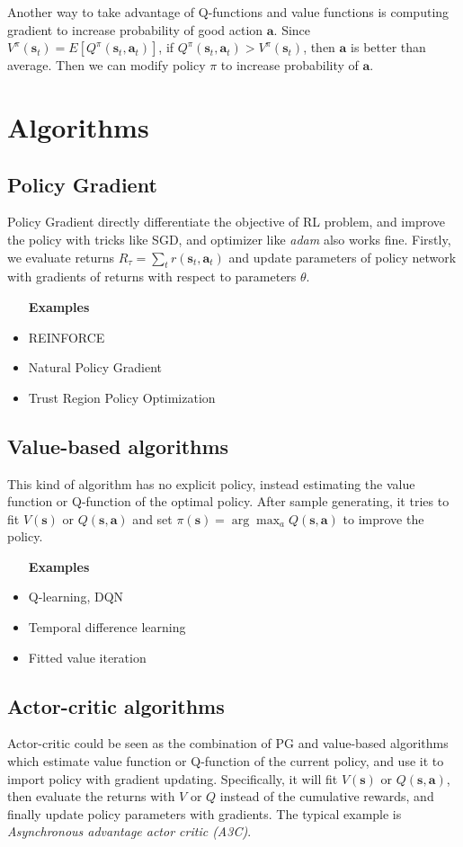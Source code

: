 \documentclass{tufte-handout}
\newcommand{\s}{\mathbf{s}}
\newcommand{\act}{\mathbf{a}}
\begin{document}
Another way to take advantage of Q-functions and value functions is computing gradient to increase probability of good action $\act$. Since
$V^\pi (\s_t) = E[Q^\pi(\s_t, \act_t)]  $, if $Q^\pi(\s_t, \act_t) > V^\pi (\s_t)$, then $\act$ is better than average. Then we can modify policy $\pi$
to increase probability of $\act$.

\section{Algorithms}

\subsection{Policy Gradient}

Policy Gradient directly differentiate the objective of RL problem, and improve the policy with tricks like SGD, and optimizer like \emph{adam}
also works fine. Firstly, we evaluate returns $R_\tau = \sum_t r(\s_t, \act_t) $ and update parameters of policy network with gradients of returns with respect to parameters $\theta$.
\begin{itemize}
  \item[\textbf{Examples}]
  \item REINFORCE
  \item Natural Policy Gradient
  \item Trust Region Policy Optimization
\end{itemize}

\subsection{Value-based algorithms}
This kind of algorithm has no explicit policy, instead estimating the value function or Q-function of the optimal policy. After sample generating, it tries to fit $V(\s)$ or $Q(\s, \act) $ and set $\pi(\s) =\arg \max_a Q(\s, \act) $ to improve the policy.
\begin{itemize}
  \item[\textbf{Examples}]
  \item Q-learning, DQN
  \item Temporal difference learning
  \item Fitted value iteration
\end{itemize}

\subsection{Actor-critic algorithms}
Actor-critic could be seen as the combination of PG and value-based algorithms which estimate value function or Q-function of the current policy, and use it to import policy with gradient updating. Specifically, it will fit $V(\s) $ or $Q(\s, \act)$, then evaluate the returns with $V$ or $Q$ instead of the cumulative rewards, and finally update policy parameters with gradients. The typical example is \emph{Asynchronous advantage actor critic (A3C)}.
\end{document}
